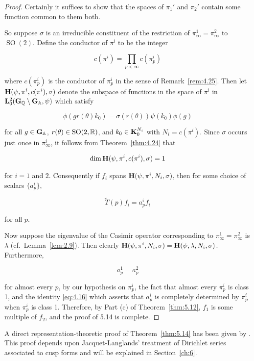 \begin{proof}

Certainly it suffices to show that the spaces of $\pi_1'$ and $\pi_2'$ contain some function common to them both.

So suppose $\sigma$ is an irreducible constituent of the restriction of $\pi_{\infty}^1 = \pi_{\infty}^2$ to $\operatorname{SO}(2)$. Define the conductor of $\pi^i$ to be the integer

\begin{equation}\label{eq:5.16}
c(\pi^i) = \prod_{p < \infty} c(\pi_p^i)\tag{5.16}
\end{equation}

where $c(\pi_p^i)$ is the conductor of $\pi_p^i$ in the sense of Remark~\ref{rem:4.25}. Then let $\mathbf{H}(\psi,\pi^i,c(\pi^i),\sigma)$ denote the subspace of functions in the space of $\pi^i$ in $\mathbf{L}_0^2(\mathbf{G}_{\mathbb{Q}} \setminus \mathbf{G}_{\mathbb{A}},\psi)$ which satisfy

\[
\phi(gr(\theta)k_0) = \sigma(r(\theta))\psi(k_0)\phi(g)
\]

for all $g \in \mathbf{G}_{\mathbb{A}}$, $r(\theta) \in \operatorname{SO}(2,\mathbb{R})$, and $k_0 \in \mathbf{K}_0^{N_i}$ with $N_i = c(\pi^i)$. Since $\sigma$ occurs just once in $\pi_{\infty}^i$, it follows from Theorem~\ref{thm:4.24} that

\[
\dim \mathbf{H}(\psi, \pi^i, c(\pi^i), \sigma) = 1
\]

for $i = 1$ and $2$. Consequently if $f_i$ spans $\mathbf{H}(\psi, \pi^i, N_i, \sigma)$, then for some choice of scalars $\{a_p^i\}$,

\[
\widetilde{T}(p) f_i = a_p^i f_i
\]

for all $p$.

Now suppose the eigenvalue of the Casimir operator corresponding to $\pi_{\infty}^1 = \pi_{\infty}^2$ is $\lambda$ (cf.\ Lemma~\ref{lem:2.9}). Then clearly $\mathbf{H}(\psi, \pi^i, N_i, \sigma) = \mathbf{H}(\psi, \lambda, N_i, \sigma)$. Furthermore,

\[
a_p^1 = a_p^2
\]

for almost every $p$, by our hypothesis on $\pi_p^i$, the fact that almost every $\pi_p^i$ is class 1, and the identity \eqref{eq:4.16} which asserts that $a_p^i$ is completely determined by $\pi_p^i$ when $\pi_p^i$ is class 1. Therefore, by Part (c) of Theorem~\ref{thm:5.12}, $f_1$ is some multiple of $f_2$, and the proof of 5.14 is complete.

\end{proof}

\begin{remark}\label{rem:5.15}

A direct representation-theoretic proof of Theorem~\ref{thm:5.14} has been given by \cite{Casselman}. This proof depends upon Jacquet-Langlands' treatment of Dirichlet series associated to cusp forms and will be explained in Section~\ref{ch:6}.

\end{remark}

